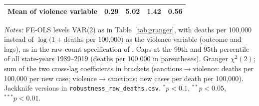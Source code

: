 \begin{table}[htbp]
\begin{threeparttable}
\begin{tabular}{lcccc}
Mean of violence variable & 0.29 & 5.02 & 1.42 & 0.56 \\
\bottomrule
\end{tabular}
\begin{tablenotes}[flushleft]\footnotesize
\item \textit{Notes:} FE-OLS levels VAR(2) as in Table~\ref{tab:granger}, with deaths per 100,000 instead of $\log(1+$deaths per 100,000$)$ as the violence variable (outcome and lags), as in the raw-count specification of \citet{jaeger2008}. Caps at the 99th and 95th percentile of all state-years 1989--2019 (deaths per 100,000 in parentheses). Granger $\chi^2(2)$; sum of the two cross-lag coefficients in brackets (sanctions$\rightarrow$violence: deaths per 100,000 per new case; violence$\rightarrow$sanctions: new cases per death per 100,000). Jackknife versions in \texttt{robustness\_raw\_deaths.csv}. $^{*}p<0.1$, $^{**}p<0.05$, $^{***}p<0.01$.
\end{tablenotes}
\end{threeparttable}
\end{table}
